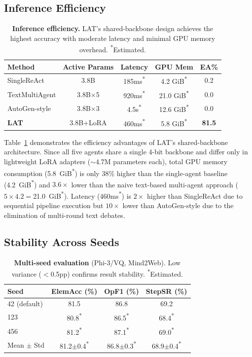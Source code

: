 \documentclass{article}
\newcommand{\best}[1]{\textbf{#1}}
\newcommand{\tbd}[1]{#1\textsuperscript{*}}
\newcommand{\ours}{\textsc{LAT}}
\begin{document}
\subsection{Inference Efficiency}

\begin{table}[t]
\centering
\caption{\textbf{Inference efficiency.}  \ours{}'s shared-backbone design achieves the highest accuracy with moderate latency and minimal GPU memory overhead.  \textsuperscript{*}Estimated.}
\label{tab:efficiency}
\small
\begin{tabular}{lcccc}
\toprule
\textbf{Method} & \textbf{Active Params} & \textbf{Latency} & \textbf{GPU Mem} & \textbf{EA\%} \\
\midrule
SingleReAct & 3.8B & \tbd{185ms} & \tbd{4.2 GiB} & 0.2 \\
TextMultiAgent & 3.8B$\times$5 & \tbd{920ms} & \tbd{21.0 GiB} & 0.0 \\
AutoGen-style & 3.8B$\times$3 & \tbd{4.5s} & \tbd{12.6 GiB} & 0.0 \\
\textbf{\ours{}} & 3.8B+LoRA & \tbd{460ms} & \tbd{5.8 GiB} & \best{81.5} \\
\bottomrule
\end{tabular}
\end{table}

Table~\ref{tab:efficiency} demonstrates the efficiency advantages of \ours{}'s shared-backbone architecture.  Since all five agents share a single 4-bit backbone and differ only in lightweight LoRA adapters (${\sim}$4.7M parameters each), total GPU memory consumption (\tbd{5.8~GiB}) is only 38\% higher than the single-agent baseline (\tbd{4.2~GiB}) and $3.6\times$ lower than the naive text-based multi-agent approach ($5 \times 4.2 = $\tbd{21.0~GiB}).
Latency (\tbd{460ms}) is $2\times$ higher than SingleReAct due to sequential pipeline execution but $10\times$ lower than AutoGen-style due to the elimination of multi-round text debates.

\subsection{Stability Across Seeds}

\begin{table}[t]
\centering
\caption{\textbf{Multi-seed evaluation} (Phi-3/VQ, Mind2Web).  Low variance ($<$0.5pp) confirms result stability.  \textsuperscript{*}Estimated.}
\label{tab:seeds}
\small
\begin{tabular}{lccc}
\toprule
\textbf{Seed} & \textbf{ElemAcc (\%)} & \textbf{OpF1 (\%)} & \textbf{StepSR (\%)} \\
\midrule
42 (default) & 81.5 & 86.8 & 69.2 \\
123 & \tbd{80.8} & \tbd{86.5} & \tbd{68.4} \\
456 & \tbd{81.2} & \tbd{87.1} & \tbd{69.0} \\
\midrule
Mean $\pm$ Std & \tbd{81.2$\pm$0.4} & \tbd{86.8$\pm$0.3} & \tbd{68.9$\pm$0.4} \\
\bottomrule
\end{tabular}
\end{table}
\end{document}
